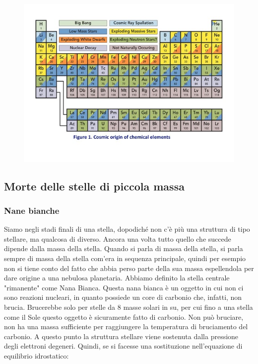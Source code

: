 \begin{figure}[H]
    \centering
    \includegraphics[width=12cm]{lezione 28 novembre/tavolaperiodica.jpg}
    \label{lezione 28 novembre/tavolaperiodica.jpg}
\end{figure}

\subsection{Morte delle stelle di piccola massa}
\subsubsection{Nane bianche}
Siamo negli stadi finali di una stella, dopodiché non c'è più una struttura di tipo stellare, ma qualcosa di diverso. Ancora una volta tutto quello che succede dipende dalla massa della stella. Quando si parla di massa della stella, si parla sempre di massa della stella com'era in sequenza principale, quindi per esempio non si tiene conto del fatto che abbia perso parte della sua massa espellendola per dare origine a una nebulosa planetaria. Abbiamo definito la stella centrale "rimanente" come Nana Bianca. Questa nana bianca è un oggetto in cui non ci sono reazioni nucleari, in quanto possiede un core di carbonio che, infatti, non brucia. Brucerebbe solo per stelle da 8 masse solari in su, per cui fino a una stella come il Sole questo oggetto è sicuramente fatto di carbonio. Non può bruciare, non ha una massa sufficiente per raggiungere la temperatura di bruciamento del carbonio. A questo punto la struttura stellare viene sostenuta dalla pressione degli elettroni degeneri. Quindi, se si facesse una sostituzione nell'equazione di equilibrio idrostatico:

